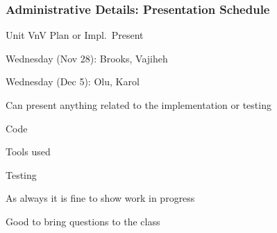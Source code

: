 \documentclass[t,12pt,numbers,fleqn]{beamer}
\begin{document}

\begin{frame}
\frametitle{Administrative Details: Presentation Schedule}

\bi
\item Unit VnV Plan or Impl.\ Present
\bi
\item Wednesday (Nov 28): Brooks, Vajiheh
\item Wednesday (Dec 5): Olu, Karol
\ei
\item Can present anything related to the implementation or testing
\bi
\item Code
\item Tools used
\item Testing
\item As always it is fine to show work in progress
\item Good to bring questions to the class
\ei
\ei

\end{frame}






\end{document}
